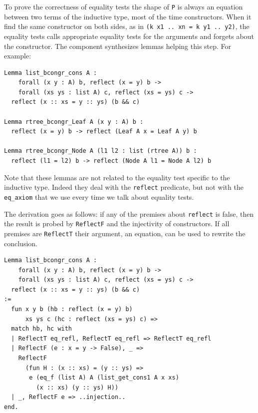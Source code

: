 \documentclass[sigplan,10pt,review]{acmart}\settopmatter{printfolios=true,printccs=false,printacmref=false}
\newcommand{\derive}[1]{\keys{#1}}
\begin{document}
\noindent
To prove the correctness of equality tests the shape of
\lstinline+P+ is always an equation between two terms of
the inductive type, most of the time constructors.
When it find the same constructor on both sides, as in
\lstinline+(k x1 .. xn = k y1 .. y2)+, the equality tests
calls appropriate equality tests for the arguments and forgets about
the constructor. The \derive{bcongr} component synthesizes lemmas
helping this step. For example:

\begin{minipage}{\textwidth}\begin{lstlisting}
Lemma list_bcongr_cons A :
    forall (x y : A) b, reflect (x = y) b ->
    forall (xs ys : list A) c, reflect (xs = ys) c ->
  reflect (x :: xs = y :: ys) (b && c)

Lemma rtree_bcongr_Leaf A (x y : A) b :
  reflect (x = y) b -> reflect (Leaf A x = Leaf A y) b

Lemma rtree_bcongr_Node A (l1 l2 : list (rtree A)) b :
  reflect (l1 = l2) b -> reflect (Node A l1 = Node A l2) b
\end{lstlisting}\end{minipage}

\noindent
Note that these lemmas are not related to the
equality test specific to the inductive type. Indeed they deal
with the \lstinline+reflect+ predicate, but not with the
\lstinline+eq_axiom+ that we use every time we talk about equality tests.

The derivation goes as follows: if any of the premises about
\lstinline+reflect+ is false, then the result is probed by
\lstinline+ReflectF+ and the injectivity of constructors.
If all premises are \lstinline+ReflectT+ their argument,
an equation, can be used to rewrite the conclusion.

\begin{minipage}{\textwidth}\begin{lstlisting}
Lemma list_bcongr_cons A :
    forall (x y : A) b, reflect (x = y) b ->
    forall (xs ys : list A) c, reflect (xs = ys) c ->
  reflect (x :: xs = y :: ys) (b && c)
:=
  fun x y b (hb : reflect (x = y) b)
      xs ys c (hc : reflect (xs = ys) c) =>
  match hb, hc with
  | ReflectT eq_refl, ReflectT eq_refl => ReflectT eq_refl
  | ReflectF (e : x = y -> False), _ =>
    ReflectF
      (fun H : (x :: xs) = (y :: ys) =>
       e (eq_f (list A) A (list_get_cons1 A x xs)
         (x :: xs) (y :: ys) H))
  | _, ReflectF e => ..injection..
end.
\end{lstlisting}\end{minipage}
\end{document}
